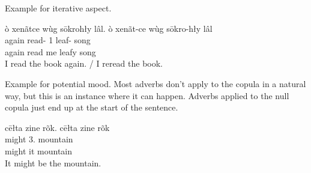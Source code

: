 Example for iterative aspect.
\begin{exe}
    \ex
    \glt
    ò xenãtce wùg sōkrohły lâl.
    \glll
    ò xenãt-ce wùg sōkro-hły lâl \\
    again read-\Pst{} 1\Sg{} leaf-\Adj{} song \\
    again read me leafy song \\
    \glt
    I read the book again.
    /
    I reread the book.
\end{exe}

Example for potential mood.
Most adverbs don't apply to the copula in a natural way,
but this is an instance where it can happen.
Adverbs applied to the null copula just end up at the start of the sentence.
\begin{exe}
    \ex
    \glt
    cēłta zine rõk.
    \glll
    cēłta zine rõk \\
    might 3\Sg{}.\Inanim{} mountain \\
    might it mountain \\
    \glt
    It might be the mountain.
\end{exe}

